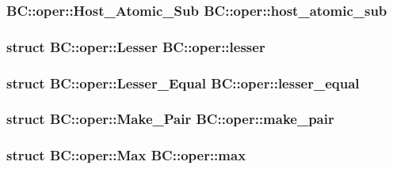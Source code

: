 \subsubsection[{\texorpdfstring{host\+\_\+atomic\+\_\+sub}{host_atomic_sub}}]{\setlength{\rightskip}{0pt plus 5cm} {\bf B\+C\+::oper\+::\+Host\+\_\+\+Atomic\+\_\+\+Sub}  B\+C\+::oper\+::host\+\_\+atomic\+\_\+sub}\hypertarget{namespaceBC_1_1oper_a7adeec097938862381d9ff776f549e22}{}\label{namespaceBC_1_1oper_a7adeec097938862381d9ff776f549e22}
\subsubsection[{\texorpdfstring{lesser}{lesser}}]{\setlength{\rightskip}{0pt plus 5cm}struct {\bf B\+C\+::oper\+::\+Lesser}  B\+C\+::oper\+::lesser}\hypertarget{namespaceBC_1_1oper_a832fb908c1469df64b2f41fb2240a20c}{}\label{namespaceBC_1_1oper_a832fb908c1469df64b2f41fb2240a20c}
\subsubsection[{\texorpdfstring{lesser\+\_\+equal}{lesser_equal}}]{\setlength{\rightskip}{0pt plus 5cm}struct {\bf B\+C\+::oper\+::\+Lesser\+\_\+\+Equal}  B\+C\+::oper\+::lesser\+\_\+equal}\hypertarget{namespaceBC_1_1oper_ae2c9aad2cce5442ac9e8941b3cf4d8d6}{}\label{namespaceBC_1_1oper_ae2c9aad2cce5442ac9e8941b3cf4d8d6}
\subsubsection[{\texorpdfstring{make\+\_\+pair}{make_pair}}]{\setlength{\rightskip}{0pt plus 5cm}struct {\bf B\+C\+::oper\+::\+Make\+\_\+\+Pair}  B\+C\+::oper\+::make\+\_\+pair}\hypertarget{namespaceBC_1_1oper_a33f7b39d30053636d0aee94d1ba02e1f}{}\label{namespaceBC_1_1oper_a33f7b39d30053636d0aee94d1ba02e1f}
\subsubsection[{\texorpdfstring{max}{max}}]{\setlength{\rightskip}{0pt plus 5cm}struct {\bf B\+C\+::oper\+::\+Max}  B\+C\+::oper\+::max}\hypertarget{namespaceBC_1_1oper_a13b71b59ec554155c3d0a8667f181a0a}{}\label{namespaceBC_1_1oper_a13b71b59ec554155c3d0a8667f181a0a}
